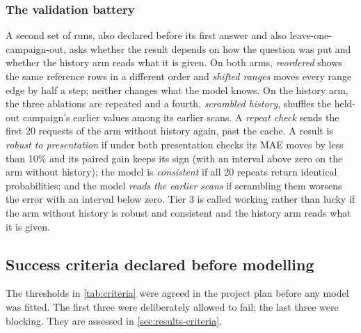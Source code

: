 \subsubsection{The validation battery}
\label{sec:validation-methods}

A second set of runs, also declared before its first answer and also leave-one-campaign-out, asks whether the result
depends on how the question was put and whether the history arm reads what it is given. On both arms,
\emph{reordered} shows the same reference rows in a different order and \emph{shifted ranges} moves every range edge
by half a step; neither changes what the model knows. On the history arm, the three ablations are repeated and a
fourth, \emph{scrambled history}, shuffles the held-out campaign's earlier values among its earlier scans. A
\emph{repeat check} sends the first 20 requests of the arm without history again, past the cache. A result is
\emph{robust to presentation} if under both presentation checks its MAE moves by less than 10\% and its paired gain
keeps its sign (with an interval above zero on the arm without history); the model is \emph{consistent} if all 20
repeats return identical probabilities; and the model \emph{reads the earlier scans} if scrambling them worsens the
error with an interval below zero. Tier 3 is called working rather than lucky if the arm without history is robust
and consistent and the history arm reads what it is given.

\subsection{Success criteria declared before modelling}
\label{sec:criteria}

The thresholds in \cref{tab:criteria} were agreed in the project plan before any model was fitted. The first three
were deliberately allowed to fail; the last three were blocking. They are assessed in \cref{sec:results-criteria}.


